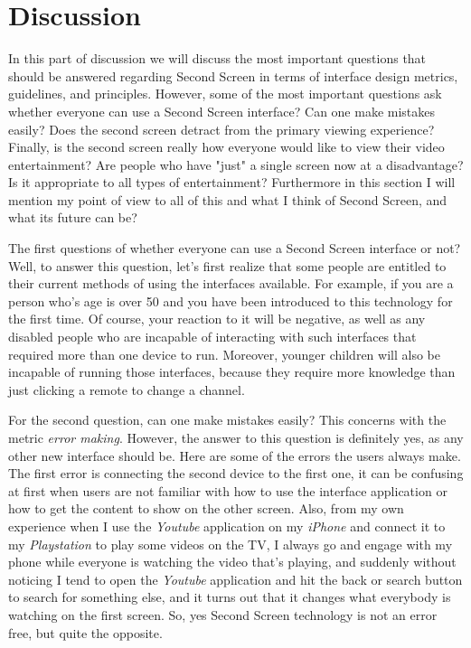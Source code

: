\documentclass[12pt, oneside]{amsart}   	%
\begin{document}
 \section{Discussion}
 In this part of discussion we will discuss the most important questions that should be answered regarding Second Screen in terms of interface design metrics, guidelines, and principles.  However, some of the most important questions ask whether everyone can use a Second Screen interface? Can one make mistakes easily? Does the second screen detract from the primary viewing experience?  Finally, is the second screen really how everyone would like to view their video entertainment? Are people who have "just" a single screen now at a disadvantage? Is it appropriate to all types of entertainment?  Furthermore in this section I will mention my point of view to all of this and what I think of Second Screen, and what its future can be?
 
 The first questions of whether everyone can use a Second Screen interface or not?  Well, to answer this question, let's first realize that some people are entitled to their current methods of using the interfaces available.  For example, if you are a person who's age is over 50 and you have been introduced to this technology for the first time.  Of course, your reaction to it will be negative, as well as any disabled people who are incapable of interacting with such interfaces that required more than one device to run.  Moreover, younger children will also be incapable of running those interfaces, because they require more knowledge than just clicking a remote to change a channel. 
 
 For the second question, can one make mistakes easily?  This concerns with the metric  \emph{error making}. However, the answer to this question is definitely yes, as any other new interface should be.  Here are some of the errors the users always make.  The first error is connecting the second device to the first one, it can be confusing at first when users are not familiar with how to use the interface application or how to get the content to show on the other screen.  Also, from my own experience when I use the \emph{Youtube} application on my  \emph{iPhone} and connect it to my  \emph{Playstation} to play  some videos on the TV, I always go and engage with my phone while everyone is watching the video that's playing,  and suddenly without noticing I tend to open the \emph{Youtube} application and hit the back or search button to search for something else, and it turns out that it changes what everybody is watching on the first screen.  So, yes Second Screen technology is not an error free, but quite the opposite.
 
\end{document}
